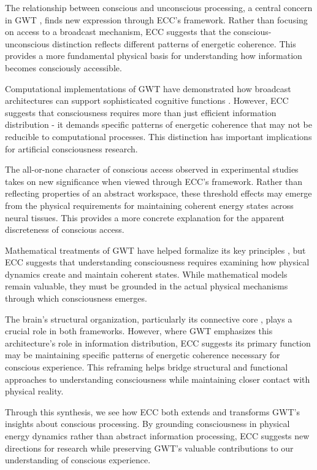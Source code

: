 \begin{refsection}
The relationship between conscious and unconscious processing, a central concern in GWT \cite{Dehaene2011}, finds new expression through ECC's framework. Rather than focusing on access to a broadcast mechanism, ECC suggests that the conscious-unconscious distinction reflects different patterns of energetic coherence. This provides a more fundamental physical basis for understanding how information becomes consciously accessible.

Computational implementations of GWT have demonstrated how broadcast architectures can support sophisticated cognitive functions \cite{Franklin1999}. However, ECC suggests that consciousness requires more than just efficient information distribution - it demands specific patterns of energetic coherence that may not be reducible to computational processes. This distinction has important implications for artificial consciousness research.

The all-or-none character of conscious access observed in experimental studies \cite{Sergent2004} takes on new significance when viewed through ECC's framework. Rather than reflecting properties of an abstract workspace, these threshold effects may emerge from the physical requirements for maintaining coherent energy states across neural tissues. This provides a more concrete explanation for the apparent discreteness of conscious access.

Mathematical treatments of GWT have helped formalize its key principles \cite{Wallace2005}, but ECC suggests that understanding consciousness requires examining how physical dynamics create and maintain coherent states. While mathematical models remain valuable, they must be grounded in the actual physical mechanisms through which consciousness emerges.

The brain's structural organization, particularly its connective core \cite{Shanahan2012}, plays a crucial role in both frameworks. However, where GWT emphasizes this architecture's role in information distribution, ECC suggests its primary function may be maintaining specific patterns of energetic coherence necessary for conscious experience. This reframing helps bridge structural and functional approaches to understanding consciousness while maintaining closer contact with physical reality.

Through this synthesis, we see how ECC both extends and transforms GWT's insights about conscious processing. By grounding consciousness in physical energy dynamics rather than abstract information processing, ECC suggests new directions for research while preserving GWT's valuable contributions to our understanding of conscious experience.


\end{refsection}
